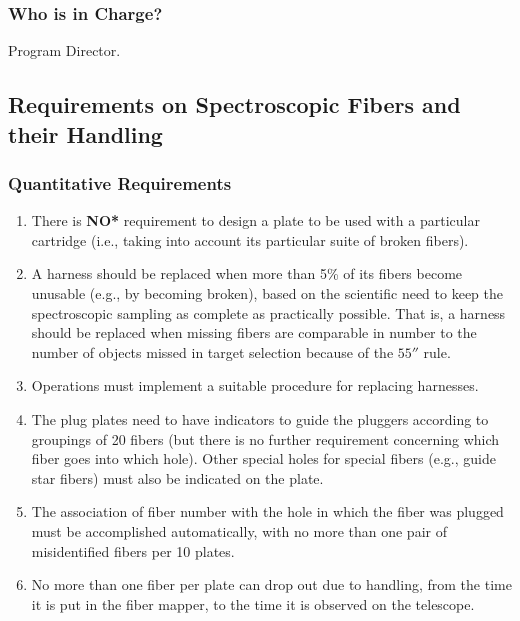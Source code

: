 \subsubsection{Who is in Charge?}

Program Director. 


\subsection{Requirements on Spectroscopic Fibers and their Handling}

\subsubsection{Quantitative Requirements}

\begin{enumerate} 
\item There is {\bf *NO*} requirement to design a plate to be used with a particular 
cartridge (i.e., taking into account its particular suite of broken fibers). 

\item A harness should be replaced when more than 5\% of its fibers
become unusable (e.g., by becoming broken),
based on the scientific need to keep the spectroscopic sampling as complete 
as practically possible.  That is, a harness should be replaced when
missing fibers are comparable in number to the number of objects
missed in target selection because of the $55''$ rule. 

\item Operations must implement a suitable procedure for replacing harnesses.

\item The plug plates need to have indicators to guide the pluggers according to 
groupings of 20 fibers (but there is no further requirement concerning 
which fiber goes into which hole).  Other special holes for special fibers 
(e.g., guide star fibers) must also be indicated on the plate. 

\item The association of fiber number with the hole in which the fiber
was plugged must be  accomplished automatically, with no more than one
pair of misidentified fibers per 10 plates. 

\item No more than one fiber per plate can drop out due
to handling, from the time it is put in the fiber mapper, to the time
it is observed on the telescope. 
\end{enumerate}

